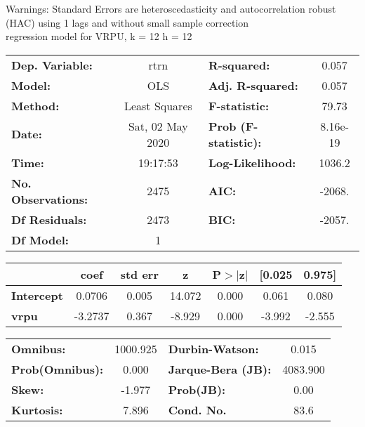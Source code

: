 Warnings: \newline
 [1] Standard Errors are heteroscedasticity and autocorrelation robust (HAC) using 1 lags and without small sample correction\\ 

regression model for VRPU, k = 12 h = 12\begin{center}
\begin{tabular}{lclc}
\toprule
\textbf{Dep. Variable:}    &       rtrn       & \textbf{  R-squared:         } &     0.057   \\
\textbf{Model:}            &       OLS        & \textbf{  Adj. R-squared:    } &     0.057   \\
\textbf{Method:}           &  Least Squares   & \textbf{  F-statistic:       } &     79.73   \\
\textbf{Date:}             & Sat, 02 May 2020 & \textbf{  Prob (F-statistic):} &  8.16e-19   \\
\textbf{Time:}             &     19:17:53     & \textbf{  Log-Likelihood:    } &    1036.2   \\
\textbf{No. Observations:} &        2475      & \textbf{  AIC:               } &    -2068.   \\
\textbf{Df Residuals:}     &        2473      & \textbf{  BIC:               } &    -2057.   \\
\textbf{Df Model:}         &           1      & \textbf{                     } &             \\
\bottomrule
\end{tabular}
\begin{tabular}{lcccccc}
                   & \textbf{coef} & \textbf{std err} & \textbf{z} & \textbf{P$> |$z$|$} & \textbf{[0.025} & \textbf{0.975]}  \\
\midrule
\textbf{Intercept} &       0.0706  &        0.005     &    14.072  &         0.000        &        0.061    &        0.080     \\
\textbf{vrpu}      &      -3.2737  &        0.367     &    -8.929  &         0.000        &       -3.992    &       -2.555     \\
\bottomrule
\end{tabular}
\begin{tabular}{lclc}
\textbf{Omnibus:}       & 1000.925 & \textbf{  Durbin-Watson:     } &    0.015  \\
\textbf{Prob(Omnibus):} &   0.000  & \textbf{  Jarque-Bera (JB):  } & 4083.900  \\
\textbf{Skew:}          &  -1.977  & \textbf{  Prob(JB):          } &     0.00  \\
\textbf{Kurtosis:}      &   7.896  & \textbf{  Cond. No.          } &     83.6  \\
\bottomrule
\end{tabular}
\end{center}


